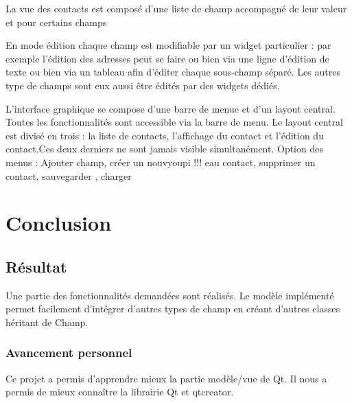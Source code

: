 \documentclass{report}
\begin{document}
La vue des contacts est composé d’une liste de champ accompagné de leur
valeur et pour certains champs

En mode édition chaque champ est modifiable par un widget particulier : par
exemple l'édition des adresses peut se faire ou bien via une ligne d’édition de texte ou bien via un
tableau afin d’éditer chaque sous-champ séparé.  Les autres type de champs sont
eux aussi être édités par des widgets dédiés.

L'interface graphique se compose d'une barre de menue et d'un layout central. Toutes les fonctionnalités sont accessible via la barre de menu. Le layout central est divisé en trois : la liste de contacts, l'affichage du contact et l'édition du contact.Ces deux derniers ne sont jamais visible simultanément.
Option des menus : Ajouter champ, créer un nouvyoupi !!!
eau contact, supprimer un contact, sauvegarder , charger
\chapter{Conclusion}
\section{Résultat}
Une partie des fonctionnalités demandées sont réalisés.
Le modèle implémenté permet facilement d’intégrer d’autres types de champ
en créant d’autres classes héritant de Champ.
\subsection{Avancement personnel}
Ce projet a permis d’apprendre mieux la partie modèle/vue de Qt.
Il nous a permis de mieux connaître la librairie Qt et qtcreator.
\end{document}

